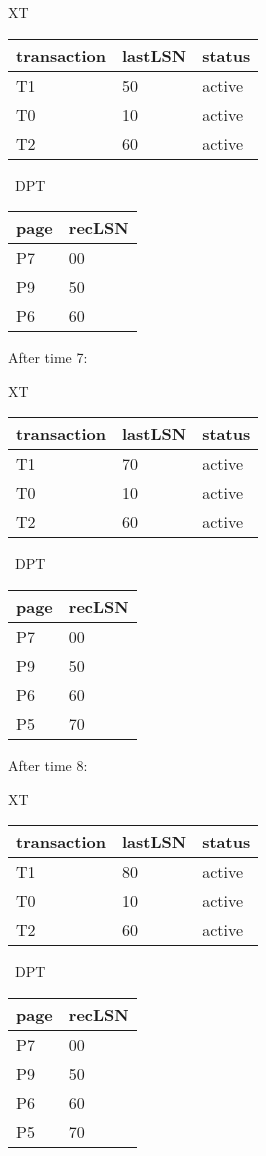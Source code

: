 \documentclass[11pt]{article}
\begin{document}
  XT   \begin{tabular}{ |l |l |l |}\hline
    transaction & lastLSN & status \\\hline
    T1 & 50 & active  \\\hline
    T0 & 10 & active  \\\hline
    T2 & 60 & active  \\\hline
    \end{tabular} 
   \ DPT \begin{tabular}{ |l |l |}\hline
      page & recLSN \\\hline
      P7 & 00  \\\hline
      P9 & 50  \\\hline
      P6 & 60  \\\hline
      \end{tabular}


  After time 7:
  
  XT   \begin{tabular}{ |l |l |l |}\hline
    transaction & lastLSN & status \\\hline
    T1 & 70 & active  \\\hline
    T0 & 10 & active  \\\hline
    T2 & 60 & active  \\\hline
    \end{tabular} 
   \ DPT \begin{tabular}{ |l |l |}\hline
      page & recLSN \\\hline
      P7 & 00  \\\hline
      P9 & 50  \\\hline
      P6 & 60  \\\hline
      P5 & 70  \\\hline
      \end{tabular}
  
  After time 8:
  
  XT   \begin{tabular}{ |l |l |l |}\hline
    transaction & lastLSN & status \\\hline
    T1 & 80 & active  \\\hline
    T0 & 10 & active  \\\hline
    T2 & 60 & active  \\\hline
    \end{tabular} 
   \ DPT \begin{tabular}{ |l |l |}\hline
      page & recLSN \\\hline
      P7 & 00  \\\hline
      P9 & 50  \\\hline
      P6 & 60  \\\hline
      P5 & 70  \\\hline
      \end{tabular}
\end{document}
